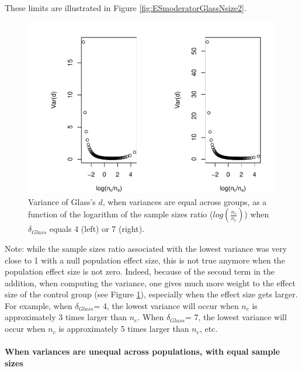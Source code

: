 \documentclass[
  english,
  man,mask]{apa6}
\let\oldparagraph\paragraph
\renewcommand{\paragraph}[1]{\oldparagraph{#1}\mbox{}}
\begin{document}
These limits are illustrated in Figure \ref{fig:ESmoderatorGlassNsize2}.

\begin{figure}
\centering
\includegraphics{Theoretical-Bias-of-all-estimators-as-a-function-of-population-parameters_files/figure-latex/varglasshomNratiobis2-1.pdf}
\caption{\label{fig:varglasshomNratiobis2}Variance of Glass's \(d\), when variances are equal across groups, as a function of the logarithm of the sample sizes ratio (\(log\left(\frac{n_c}{n_e} \right)\)) when \(\delta_{Glass}\) equals 4 (left) or 7 (right).}
\end{figure}

Note: while the sample sizes ratio associated with the lowest variance was very close to 1 with a null population effect size, this is not true anymore when the population effect size is not zero. Indeed, because of the second term in the addition, when computing the variance, one gives much more weight to the effect size of the control group (see Figure \ref{fig:varglasshomNratiobis2}), especially when the effect size gets larger. For example, when \(\delta_{Glass}\)= 4, the lowest variance will occur when \(n_c\) is approximately 3 times larger than \(n_e\). When \(\delta_{Glass}\)= 7, the lowest variance will occur when \(n_c\) is approximately 5 times larger than \(n_e\), etc.

\hypertarget{when-variances-are-unequal-across-populations-with-equal-sample-sizes-2}{%
\paragraph{When variances are unequal across populations, with equal sample sizes}\label{when-variances-are-unequal-across-populations-with-equal-sample-sizes-2}}
\end{document}

